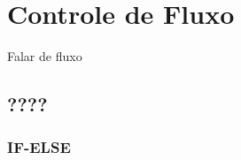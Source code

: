 \chapter{Controle de Fluxo}
\label{cap:fuxos}

Falar de fluxo

\section{????}


\subsection{IF-ELSE}
